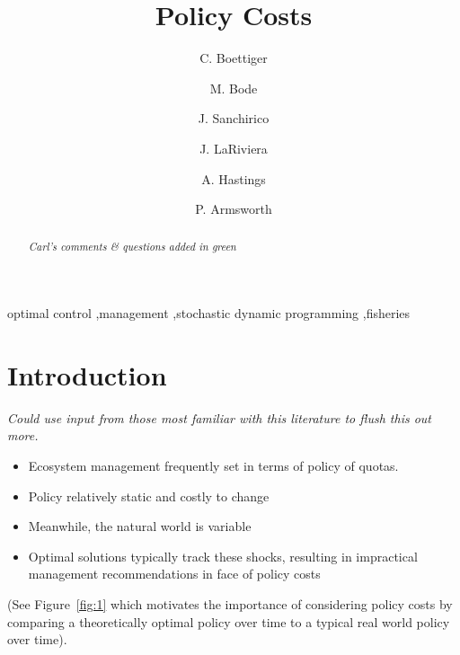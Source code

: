 \documentclass[authoryear, review, 12pt]{elsarticle}
\newcommand{\cdb}[1]{{\it \color{darkgreen} #1}}
\begin{document}
\begin{frontmatter}
\title{Policy Costs}
\author[cpb]{C. Boettiger}
\author[melbourne]{M. Bode}
\author[esp]{J. Sanchirico}
\author[utk-econ]{J. LaRiviera}
\author[cpb,esp]{A. Hastings}
\author[utk-eeb]{P. Armsworth}
\address[cpb]{Center for Population Biology, University of California, Davis, California 95616, USA}
\address[esp]{Department of Environmental Science \& Policy, University of California, Davis, CA 95616, USA}
\address[utk-econ]{Department of Economics, University of Tennessee, Knoxville, TN 37996, USA}
\address[utk-eeb]{Department of Ecology and Evolutionary Biology, University of Tennessee, Knoxville, TN 37996, USA}
\address[melbourne]{Australian Research Council Centre of Excellence for Environmental Decisions, University of Melbourne, School of Botany,
Parkville, Melbourne, VIC 3010, Australia}

\begin{abstract}
\cdb{Carl's comments \& questions added in green}
\end{abstract}
\begin{keyword}
  optimal control \sep management \sep stochastic dynamic programming \sep fisheries 
\end{keyword}

\end{frontmatter}

\section{Introduction}


\emph{Could use input from those most familiar with this literature to flush this out more.}

\begin{itemize}
  \item Ecosystem management frequently set in terms of policy of quotas. 
  \item Policy relatively static and costly to change
  \item Meanwhile, the natural world is variable
  \item Optimal solutions typically track these shocks, resulting in impractical management recommendations in face of policy costs
\end{itemize}

(See Figure~\ref{fig:1} which motivates the importance of considering policy costs by comparing a theoretically optimal policy over time to a typical real world policy over time).  
\end{document}
